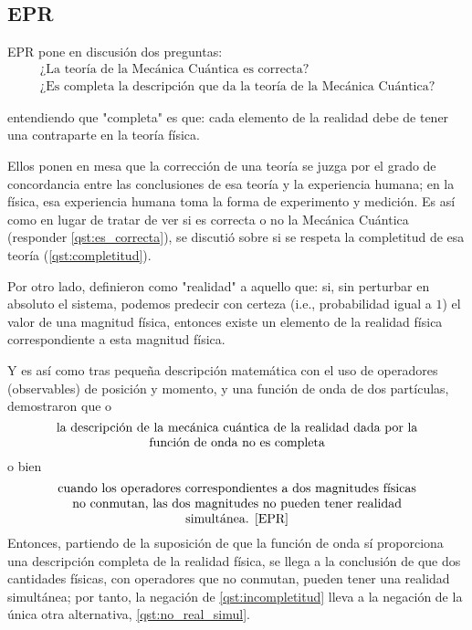\subsection{EPR}%

EPR pone en discusión dos preguntas:
\begin{gather}
	\text{¿La teoría de la Mecánica Cuántica es correcta?}
	\label{qst:es_correcta}
	\\
	\text{¿Es completa la descripción que da la teoría de la Mecánica Cuántica?}
	\label{qst:completitud}
\end{gather}

entendiendo que "completa" es que: cada elemento de la realidad debe de tener una contraparte en la teoría física. \cite{EPR}

Ellos ponen en mesa que la corrección de una teoría se juzga por el grado de concordancia entre las conclusiones de esa teoría y la experiencia humana; en la física, esa experiencia humana toma la forma de experimento y medición. Es así como en lugar de tratar de ver si es correcta o no la Mecánica Cuántica (responder \ref{qst:es_correcta}), se discutió sobre si se respeta la completitud de esa teoría (\ref{qst:completitud}).

Por otro lado, definieron como "realidad" a aquello que: si, sin perturbar en absoluto el sistema, podemos predecir con certeza (i.e., probabilidad igual a $1$) el valor de una magnitud física, entonces existe un elemento de la realidad física correspondiente a esta magnitud física. \cite{EPR}

Y es así como tras pequeña descripción matemática con el uso de operadores (observables) de posición y momento, y una función de onda de dos partículas, demostraron que o
\begin{equation}
	\text{\parbox{0.85\linewidth}{\centering la descripción de la mecánica cuántica de la realidad dada por la función de onda no es completa}}
	\label{qst:incompletitud}
\end{equation}
o bien
\begin{equation}
	\text{\parbox{0.85\linewidth}{\centering cuando los operadores correspondientes a dos magnitudes físicas no conmutan, las dos magnitudes no pueden tener realidad simultánea. \cite{EPR}}}
	\label{qst:no_real_simul}
\end{equation}
Entonces, partiendo de la suposición de que la función de onda sí proporciona una descripción completa de la realidad física, se llega a la conclusión de que dos cantidades físicas, con operadores que no conmutan, pueden tener una realidad simultánea; por tanto, la negación de \ref{qst:incompletitud} lleva a la negación de la única otra alternativa, \ref{qst:no_real_simul}.

